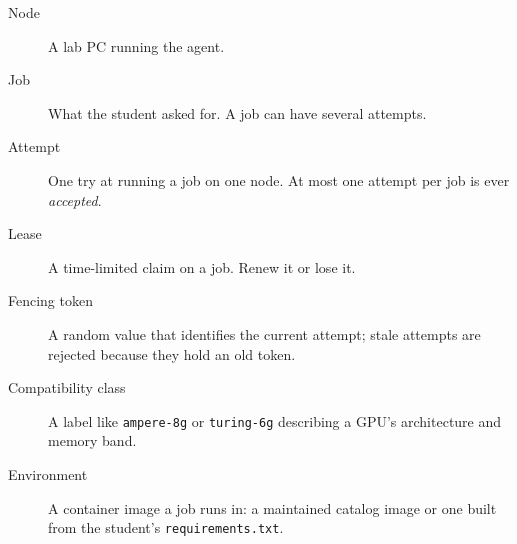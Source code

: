 \begin{description}
\item[Node] A lab PC running the agent.
\item[Job] What the student asked for. A job can have several attempts.
\item[Attempt] One try at running a job on one node. At most one attempt per
  job is ever \emph{accepted}.
\item[Lease] A time-limited claim on a job. Renew it or lose it.
\item[Fencing token] A random value that identifies the current attempt; stale
  attempts are rejected because they hold an old token.
\item[Compatibility class] A label like \texttt{ampere-8g} or
  \texttt{turing-6g} describing a GPU's architecture and memory band.
\item[Environment] A container image a job runs in: a maintained catalog image
  or one built from the student's \texttt{requirements.txt}.
\end{description}
